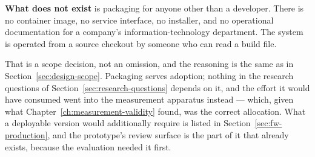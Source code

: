 \textbf{What does not exist} is packaging for anyone other than a developer. There is no
container image, no service interface, no installer, and no operational documentation for a
company's information-technology department. The system is operated from a source checkout by
someone who can read a build file.

That is a scope decision, not an omission, and the reasoning is the same as in
Section~\ref{sec:design-scope}. Packaging serves adoption; nothing in the research questions of
Section~\ref{sec:research-questions} depends on it, and the effort it would have consumed went into
the measurement apparatus instead --- which, given what Chapter~\ref{ch:measurement-validity}
found, was the correct allocation. What a deployable version would additionally require is
listed in Section~\ref{sec:fw-production}, and the prototype's review surface is the part of it that
already exists, because the evaluation needed it first.
